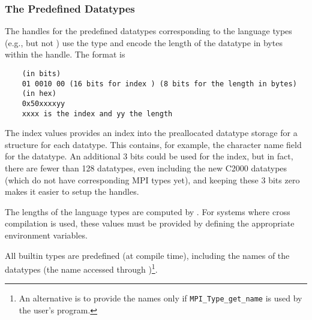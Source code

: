 \documentclass{article}
\begin{document}
\subsubsection{The Predefined Datatypes}
The handles for the predefined datatypes corresponding to the language types
(e.g.,  but not ) use the
 type and encode the length of the datatype in bytes
within the handle.  The format is
\begin{verbatim}
    (in bits)
    01 0010 00 (16 bits for index ) (8 bits for the length in bytes)
    (in hex)
    0x50xxxxyy
    xxxx is the index and yy the length
\end{verbatim}
The index values provides an index into the preallocated datatype storage for
a  structure for each datatype.  This contains, for
example, the character name field for the datatype.
An additional 3 bits could be used for the index, but in fact, there are fewer
than 128 datatypes, even including the new C2000 datatypes (which do not have
corresponding MPI types yet), and keeping these 3 bits zero makes it easier to
setup the handles.

The lengths of the language types are computed by .  For
systems where cross compilation is used, these values must be provided by
defining the appropriate  environment variables.

All builtin types are predefined (at compile time), including the
names of the datatypes (the name accessed through
)\footnote{An alternative is to provide the
names only if \texttt{MPI_Type_get_name} is used by the user's program.}.
\end{document}
